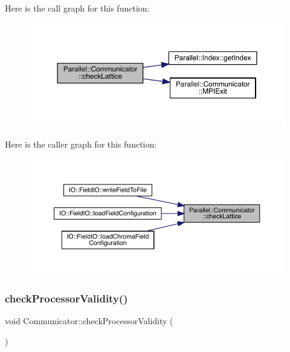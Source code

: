 Here is the call graph for this function\+:
\nopagebreak
\begin{figure}[H]
\begin{center}
\leavevmode
\includegraphics[width=350pt]{class_parallel_1_1_communicator_a9471bf9448f34a0b4575310a3c54af61_cgraph}
\end{center}
\end{figure}
Here is the caller graph for this function\+:
\nopagebreak
\begin{figure}[H]
\begin{center}
\leavevmode
\includegraphics[width=350pt]{class_parallel_1_1_communicator_a9471bf9448f34a0b4575310a3c54af61_icgraph}
\end{center}
\end{figure}
\mbox{\label{class_parallel_1_1_communicator_acd7e2f114728e5207093743a58ab3a40}} 
\subsubsection{\texorpdfstring{checkProcessorValidity()}{checkProcessorValidity()}}
{\footnotesize\ttfamily void Communicator\+::check\+Processor\+Validity (\begin{DoxyParamCaption}{ }\end{DoxyParamCaption})\hspace{0.3cm}{\ttfamily [static]}}



